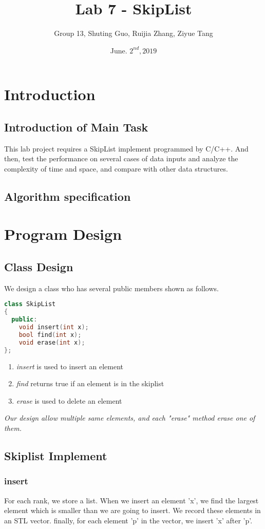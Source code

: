 \documentclass[UTF8]{report}
\title{Lab 7 - SkipList}
\author{Group 13, Shuting Guo, Ruijia Zhang, Ziyue Tang}
\date{June. $2^{nd}, 2019$}
\numberwithin{figure}{subsection}
\numberwithin{table}{subsection}
\begin{document}
\maketitle
\tableofcontents

\chapter{Introduction}
\section{Introduction of Main Task}
This lab project requires a SkipList implement programmed by
C/C++. And then,
test the performance on several cases of data inputs and analyze the complexity of time and space,
and compare with other data structures.

\section{Algorithm specification} 


\chapter{Program Design}

\section{Class Design}
We design a class who has several public
members shown as follows.
\begin{lstlisting}[language=c++]
class SkipList
{
  public:
    void insert(int x);
    bool find(int x);
    void erase(int x);
};
\end{lstlisting}
\begin{enumerate}
\item{\textit{insert} is used to insert an element}
\item{\textit{find} returns true if an element is in the skiplist}
\item{\textit{erase} is used to delete an element}
\end{enumerate}
\textit{Our design allow multiple same elements, and each "erase" method erase one of them.}

\section{Skiplist Implement}

\subsection{insert}
For each rank, we store a list. When we insert an element 'x', we find the largest element 
which is smaller than we are going to insert. We record these elements in an STL vector.
finally, for each element 'p' in the vector, we insert 'x' after 'p'.
\end{document}
